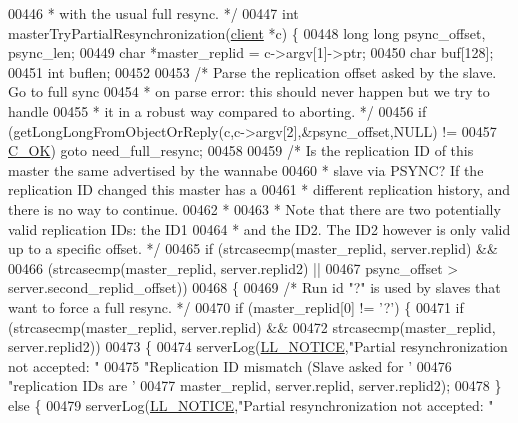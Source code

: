 \begin{DoxyCode}
{{{{{{{{{{{{{{{{{{{{00446 \textcolor{comment}{ * with the usual full resync. */}
00447 \textcolor{keywordtype}{int} masterTryPartialResynchronization(\hyperlink{structclient}{client} *c) \{
00448     \textcolor{keywordtype}{long} \textcolor{keywordtype}{long} psync\_offset, psync\_len;
00449     \textcolor{keywordtype}{char} *master\_replid = c->argv[1]->ptr;
00450     \textcolor{keywordtype}{char} buf[128];
00451     \textcolor{keywordtype}{int} buflen;
00452 
00453     \textcolor{comment}{/* Parse the replication offset asked by the slave. Go to full sync}
00454 \textcolor{comment}{     * on parse error: this should never happen but we try to handle}
00455 \textcolor{comment}{     * it in a robust way compared to aborting. */}
00456     \textcolor{keywordflow}{if} (getLongLongFromObjectOrReply(c,c->argv[2],&psync\_offset,NULL) !=
00457        \hyperlink{server_8h_a303769ef1065076e68731584e758d3e1}{C\_OK}) \textcolor{keywordflow}{goto} need\_full\_resync;
00458 
00459     \textcolor{comment}{/* Is the replication ID of this master the same advertised by the wannabe}
00460 \textcolor{comment}{     * slave via PSYNC? If the replication ID changed this master has a}
00461 \textcolor{comment}{     * different replication history, and there is no way to continue.}
00462 \textcolor{comment}{     *}
00463 \textcolor{comment}{     * Note that there are two potentially valid replication IDs: the ID1}
00464 \textcolor{comment}{     * and the ID2. The ID2 however is only valid up to a specific offset. */}
00465     \textcolor{keywordflow}{if} (strcasecmp(master\_replid, server.replid) &&
00466         (strcasecmp(master\_replid, server.replid2) ||
00467          psync\_offset > server.second\_replid\_offset))
00468     \{
00469         \textcolor{comment}{/* Run id "?" is used by slaves that want to force a full resync. */}
00470         \textcolor{keywordflow}{if} (master\_replid[0] != \textcolor{stringliteral}{'?'}) \{
00471             \textcolor{keywordflow}{if} (strcasecmp(master\_replid, server.replid) &&
00472                 strcasecmp(master\_replid, server.replid2))
00473             \{
00474                 serverLog(\hyperlink{server_8h_a8c54c191e436c7dd3012167212692401}{LL\_NOTICE},\textcolor{stringliteral}{"Partial resynchronization not accepted: "}
00475                     \textcolor{stringliteral}{"Replication ID mismatch (Slave asked for '%
00476                     \textcolor{stringliteral}{"replication IDs are '%
00477                     master\_replid, server.replid, server.replid2);
00478             \} \textcolor{keywordflow}{else} \{
00479                 serverLog(\hyperlink{server_8h_a8c54c191e436c7dd3012167212692401}{LL\_NOTICE},\textcolor{stringliteral}{"Partial resynchronization not accepted: "}
}}}}}}}}}}}}}}}}}}}}}}
\end{DoxyCode}
